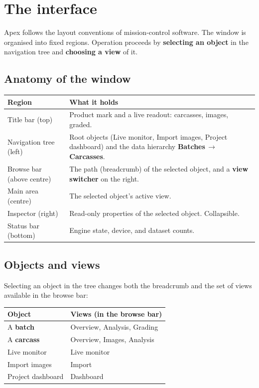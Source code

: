 \chapter{The interface}


\vspace{4pt}
Apex follows the layout conventions of mission-control software. The window is
organised into fixed regions. Operation proceeds by \textbf{selecting an object}
in the navigation tree and \textbf{choosing a view} of it.

\section{Anatomy of the window}

\begin{center}
\begin{tabularx}{\linewidth}{@{}l X@{}}
\toprule
\textbf{Region} & \textbf{What it holds} \\
\midrule
Title bar (top) & Product mark and a live readout: carcasses, images, graded. \\
Navigation tree (left) & Root objects (Live monitor, Import images, Project dashboard) and the data hierarchy \textbf{Batches\,$\rightarrow$\,Carcasses}. \\
Browse bar (above centre) & The path (breadcrumb) of the selected object, and a \textbf{view switcher} on the right. \\
Main area (centre) & The selected object's active view. \\
Inspector (right) & Read-only properties of the selected object. Collapsible. \\
Status bar (bottom) & Engine state, device, and dataset counts. \\
\bottomrule
\end{tabularx}
\end{center}

\section{Objects and views}

Selecting an object in the tree changes both the breadcrumb and the set of views
available in the browse bar:

\begin{center}
\begin{tabularx}{\linewidth}{@{}l X@{}}
\toprule
\textbf{Object} & \textbf{Views (in the browse bar)} \\
\midrule
A \textbf{batch}   & Overview, Analysis, Grading \\
A \textbf{carcass} & Overview, Images, Analysis \\
Live monitor       & Live monitor \\
Import images      & Import \\
Project dashboard  & Dashboard \\
\bottomrule
\end{tabularx}
\end{center}

